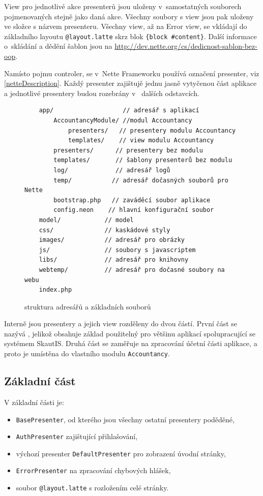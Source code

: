 \documentclass[thesis=B,czech]{FITthesis}[2011/06/14]
\begin{document}
View pro jednotlivé akce presenterů jsou uloženy v~samostatných souborech pojmenovaných stejně jako daná akce. Všechny soubory s view jsou pak uloženy ve složce s názvem presenteru. Všechny view, až na Error view, se vkládají do základního layoutu \texttt{@layout.latte} skrz blok \texttt{\{block \#content\}}. Další informace o~skládání a dědění šablon jsou na \url{http://dev.nette.org/cs/dedicnost-sablon-bez-oop}.

Namísto pojmu controler, se v~Nette Frameworku používá označení presenter, viz \ref{netteDescription}. Každý presenter zajištujě jednu jasně vytyčenou část aplikace a jednotlivé presentery budou rozebrány v ~dalších odstavcích.

\begin{figure}[h]\centering
\begin{verbatim}
    app/                   // adresář s aplikací
        AccountancyModule/ //modul Accountancy
            presenters/   // presentery modulu Accountancy
            templates/    // view modulu Accountancy
        presenters/      // presentery bez modulu
        templates/       // šablony presenterů bez modulu
        log/             // adresář logů
        temp/           // adresář dočasných souborů pro Nette
        bootstrap.php   // zaváděcí soubor aplikace
        config.neon    // hlavní konfigurační soubor
    model/            // model
    css/              // kaskádové styly
    images/           // adresář pro obrázky
    js/               // soubory s javascriptem
    libs/             // adresář pro knihovny
    webtemp/          // adresář pro dočasné soubory na webu
    index.php
\end{verbatim}
\caption{struktura adresářů a základních souborů}\label{directoryStructure}
\end{figure}

Interně jsou presentery a jejich view rozděleny do dvou částí. První část se nazývá , jelikož obsahuje základ použitelný pro většinu aplikací spolupracující se systémem SkautIS. Druhá část se zaměřuje na zpracování účetní části aplikace, a proto je umístěna do vlastního modulu \texttt{Accountancy}.

\subsection{Základní část}
V základní části je:
\begin{itemize}
	\item \texttt{BasePresenter}, od kterého jsou všechny ostatní presentery poděděné,
	\item \texttt{AuthPresenter} zajištující přihlašování,
	\item výchozí presenter \texttt{DefaultPresenter} pro zobrazení úvodní stránky,
	\item \texttt{ErrorPresenter} na zpracování chybových hlášek,
	\item soubor \texttt{@layout.latte} s rozložením celé stránky.
\end{itemize}
\end{document}
